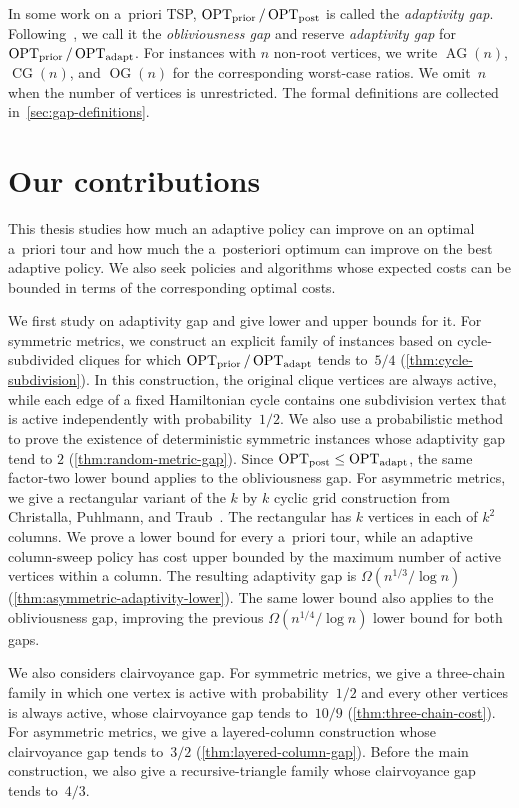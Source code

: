 \documentclass[12pt,a4paper,oneside]{report}
\begin{document}
In some work on a~priori TSP, $\operatorname{OPT}_\mathrm{prior}/\operatorname{OPT}_\mathrm{post}$ is called the
\emph{adaptivity gap}. Following~\cite{Christalla2025}, we call it the
\emph{obliviousness gap} and reserve \emph{adaptivity gap} for
$\operatorname{OPT}_\mathrm{prior}/\operatorname{OPT}_\mathrm{adapt}$. 
For instances with $n$ non-root vertices, we write $\operatorname{AG}(n)$,
$\operatorname{CG}(n)$, and $\operatorname{OG}(n)$ for the corresponding
worst-case ratios. We omit~$n$ when the number of vertices is unrestricted. The
formal definitions are collected in~\cref{sec:gap-definitions}.

\section{Our contributions}\label{sec:contributions}

This thesis studies how much an adaptive policy can improve on an optimal
a~priori tour and how much the a~posteriori optimum can improve on the best
adaptive policy. We also seek policies and algorithms whose expected costs can
be bounded in terms of the corresponding optimal costs.

We first study on adaptivity gap and give lower and upper bounds for it.
For symmetric metrics, we construct an explicit family of instances based on cycle-subdivided cliques
for which $\operatorname{OPT}_\mathrm{prior}/\operatorname{OPT}_\mathrm{adapt}$ tends to~$5/4$ (\cref{thm:cycle-subdivision}).
In this construction, the original clique vertices are always active,
while each edge of a fixed Hamiltonian cycle contains one subdivision vertex
that is active independently with probability~$1/2$.
We also use a probabilistic method to prove the existence of deterministic symmetric instances whose
adaptivity gap tend to $2$ (\cref{thm:random-metric-gap}).  
Since $\operatorname{OPT}_\mathrm{post}\le\operatorname{OPT}_\mathrm{adapt}$, the same factor-two lower bound applies to the
obliviousness gap.
For asymmetric metrics, we give a rectangular variant of the $k$ by $k$ cyclic 
grid construction from Christalla, Puhlmann, and Traub~\cite{Christalla2025}.
The rectangular has $k$ vertices in each of $k^2$ columns. We prove a lower bound
for every a~priori tour, while an adaptive column-sweep policy has cost upper bounded
by the maximum number of active vertices within a column. The resulting adaptivity 
gap is $\Omega(n^{1/3}/\log n)$ (\cref{thm:asymmetric-adaptivity-lower}).
The same lower bound also applies to the obliviousness gap, improving the previous
$\Omega(n^{1/4}/\log n)$ lower bound for both gaps.

We also considers clairvoyance gap. 
For symmetric metrics, we give a three-chain family in which one vertex is active
with probability~$1/2$ and every other vertices is always active, whose clairvoyance
gap tends to~$10/9$ (\cref{thm:three-chain-cost}). 
For asymmetric metrics, we give a layered-column construction whose clairvoyance 
gap tends to~$3/2$ (\cref{thm:layered-column-gap}).
Before the main construction, we also give a recursive-triangle family whose clairvoyance 
gap tends to~$4/3$.
\end{document}

